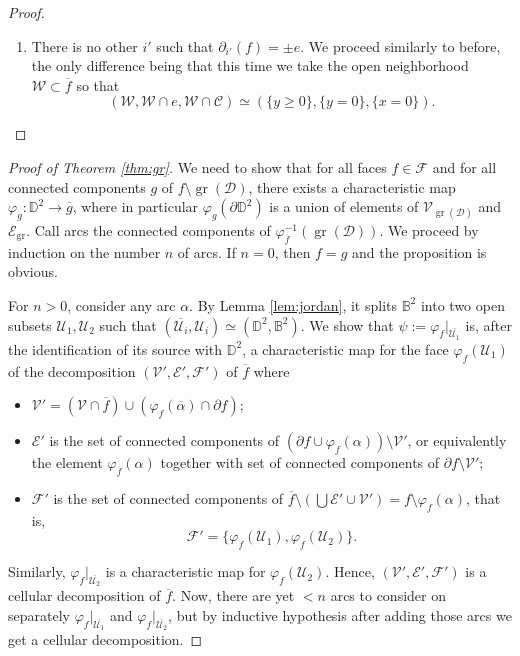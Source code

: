 \documentclass[11pt,reqno]{amsart}
\theoremstyle{plain}
\theoremstyle{definition}
\theoremstyle{remark}
\numberwithin{equation}{subsection}
\newcommand*{\bbB}{\mathbb{B}}
\newcommand*{\bbD}{\mathbb{D}}
\newcommand*{\calC}{\mathcal{C}}
\newcommand*{\calD}{\mathcal{D}}
\newcommand*{\calE}{\mathcal{E}}
\newcommand*{\calF}{\mathcal{F}}
\newcommand*{\calU}{\mathcal{U}}
\newcommand*{\calV}{\mathcal{V}}
\newcommand*{\calW}{\mathcal{W}}
\DeclareMathOperator{\gr}{gr}
\begin{document}
\begin{proof}
\begin{enumerate}
        \item There is no other $i'$ such that $\partial_{i'}(f)=\pm e$. We proceed similarly to before, the only difference being that this time we take the open neighborhood $\calW\subset\overline{f}$ so that
        \[(\calW,\calW\cap e,\calW\cap\calC)\simeq(\{y\ge0\},\{y=0\},\{x=0\}).\]
    \end{enumerate}
\end{proof}

\begin{proof}[Proof of Theorem \ref{thm:gr}]
    We need to show that for all faces $f\in\calF$ and for all connected components $g$ of $f\setminus\gr(\calD)$, there exists a characteristic map $\varphi_g\colon\bbD^2\to\overline{g}$, where in particular $\varphi_g(\partial\bbD^2)$ is a union of elements of $\calV_{\gr(\calD)}$ and $\calE_{\gr}$. Call arcs the connected components of $\varphi_f^{-1}(\gr(\calD))$. We proceed by induction on the number $n$ of arcs. If $n=0$, then $f=g$ and the proposition is obvious.

    For $n>0$, consider any arc $\alpha$. By Lemma \ref{lem:jordan}, it splits $\bbB^2$ into two open subsets $\calU_1,\calU_2$ such that $(\overline{\calU_i},\calU_i)\simeq(\bbD^2,\bbB^2)$. We show that $\psi:=\varphi_f|_{\overline{\calU_1}}$ is, after the identification of its source with $\bbD^2$, a characteristic map for the face $\varphi_f(\calU_1)$ of the decomposition $(\calV',\calE',\calF')$ of $\overline{f}$ where
    \begin{itemize}
        \item $\calV'=(\calV\cap\overline{f})\cup(\varphi_f(\overline\alpha)\cap\partial f)$;
        \item $\calE'$ is the set of connected components of $(\partial f\cup\varphi_f(\alpha))\setminus\calV'$, or equivalently the element $\varphi_f(\alpha)$ together with set of connected components of $\partial f\setminus\calV'$;
        \item $\calF'$ is the set of connected components of $\overline{f}\setminus(\bigcup\calE'\cup\calV')=f\setminus\varphi_f(\alpha)$, that is,
        \[\calF'=\{\varphi_f(\calU_1),\varphi_f(\calU_2)\}.\]
    \end{itemize}
    Similarly, $\varphi_f|_{\overline{\calU_2}}$ is a characteristic map for $\varphi_f(\calU_2)$. Hence, $(\calV',\calE',\calF')$ is a cellular decomposition of $\overline{f}$. Now, there are yet $<n$ arcs to consider on separately $\varphi_f|_{\overline{\calU_1}}$ and $\varphi_f|_{\overline{\calU_2}}$, but by inductive hypothesis after adding those arcs we get a cellular decomposition.


\end{proof}
\end{document}
